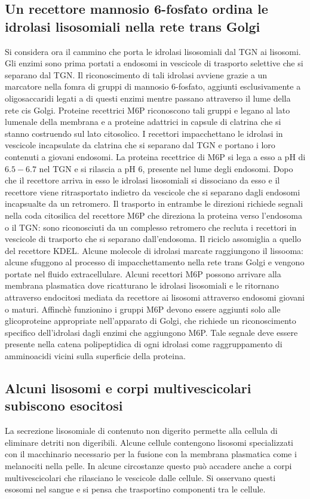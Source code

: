 \subsection{Un recettore mannosio $\mathbf{6}$-fosfato ordina le idrolasi lisosomiali nella rete trans Golgi}
Si considera ora il cammino che porta le idrolasi lisosomiali dal TGN ai lisosomi. Gli enzimi sono prima portati a endosomi in vescicole di trasporto selettive che si separano dal 
TGN. Il riconoscimento di tali idrolasi avviene grazie a un marcatore nella fomra di gruppi di mannosio $6$-fosfato, aggiunti esclusivamente a oligosaccaridi legati a  di questi
enzimi mentre passano attraverso il lume della rete cis Golgi. Proteine recettrici M6P riconoscono tali gruppi e legano al lato lumenale della membrana e a proteine adattrici in 
capsule di clatrina che si stanno costruendo sul lato citosolico. I recettori impacchettano le idrolasi in vescicole incapsulate da clatrina che si separano dal TGN e portano i loro
contenuti a giovani endosomi. La proteina recettrice di M6P si lega a esso a pH di $6.5-6.7$ nel TGN e si rilascia a pH $6$, presente nel lume degli endosomi. Dopo che il recettore
arriva in esso le idrolasi lisosomiali si dissociano da esso e il recettore viene ritrasportato indietro da vescicole che si separano dagli endosomi incapsualte da un retromero. 
Il trasporto in entrambe le direzioni richiede segnali nella coda citosilica del recettore M6P che direziona la proteina verso l'endosoma o il TGN: sono riconosciuti da un complesso 
retromero che recluta i recettori in vescicole di trasporto che si separano dall'endosoma. Il riciclo assomiglia a quello del recettore KDEL. Alcune molecole di idrolasi marcate 
raggiungono il lissooma: alcune sfuggono al processo di impacchettamento nella rete trans Golgi e vengono portate nel fluido extracellulare. Alcuni recettori M6P possono arrivare alla
membrana plasmatica dove ricatturano le idrolasi lisosomiali e le ritornano attraverso endocitosi mediata da recettore ai lisosomi attraverso endosomi giovani o maturi. Affinch\`e
funzionino i gruppi M6P devono essere aggiunti solo alle glicoproteine appropriate nell'apparato di Golgi, che richiede un riconoscimento specifico dell'idrolasi dagli enzimi che 
aggiungono M6P. Tale segnale deve essere presente nella catena polipeptidica di ogni idrolasi come raggruppamento di amminoacidi vicini sulla superficie della proteina. 
\subsection{Alcuni lisosomi e corpi multivescicolari subiscono esocitosi}
La secrezione lisosomiale di contenuto non digerito permette alla cellula di eliminare detriti non digeribili. Alcune cellule contengono lisosomi specializzati con il macchinario 
necessario per la fusione con la membrana plasmatica come i melanociti nella pelle. In alcune circostanze questo pu\`o accadere anche a corpi multivescicolari che rilasciano le
vescicole dalle cellule. Si osservano questi esosomi nel sangue e si pensa che trasportino componenti tra le cellule. 
